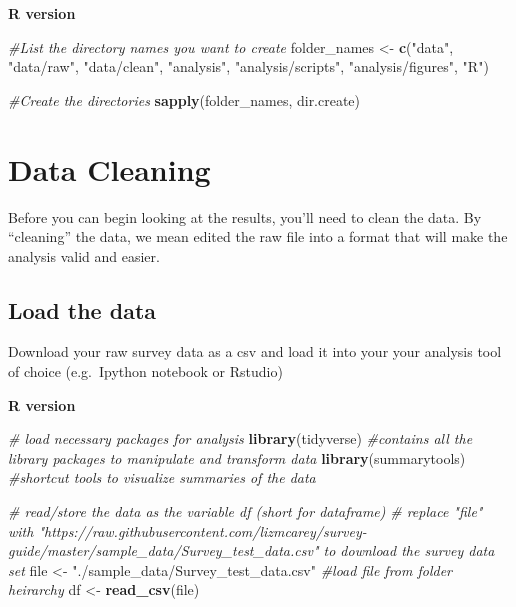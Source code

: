 \documentclass[]{book}
\newenvironment{Shaded}{\begin{snugshade}}{\end{snugshade}}
\newcommand{\CommentTok}[1]{\textcolor[rgb]{0.56,0.35,0.01}{\textit{#1}}}
\newcommand{\KeywordTok}[1]{\textcolor[rgb]{0.13,0.29,0.53}{\textbf{#1}}}
\newcommand{\NormalTok}[1]{#1}
\newcommand{\StringTok}[1]{\textcolor[rgb]{0.31,0.60,0.02}{#1}}
\begin{document}
\textbf{R version}

\begin{Shaded}
\begin{Highlighting}[]
\CommentTok{#List the directory names you want to create}
\NormalTok{folder_names <-}\StringTok{ }\KeywordTok{c}\NormalTok{(}\StringTok{"data"}\NormalTok{, }
                    \StringTok{"data/raw"}\NormalTok{, }
                    \StringTok{"data/clean"}\NormalTok{, }
                  \StringTok{"analysis"}\NormalTok{, }
                    \StringTok{"analysis/scripts"}\NormalTok{, }
                     \StringTok{"analysis/figures"}\NormalTok{, }
                  \StringTok{"R"}\NormalTok{)}

\CommentTok{#Create the directories}
\KeywordTok{sapply}\NormalTok{(folder_names, dir.create)}
\end{Highlighting}
\end{Shaded}

\hypertarget{data-cleaning}{%
\section{Data Cleaning}\label{data-cleaning}}

Before you can begin looking at the results, you'll need to clean the data. By ``cleaning'' the data, we mean edited the raw file into a format that will make the analysis valid and easier.

\hypertarget{load-the-data}{%
\subsection{Load the data}\label{load-the-data}}

Download your raw survey data as a csv and load it into your your analysis tool of choice (e.g.~Ipython notebook or Rstudio)

\textbf{R version}

\begin{Shaded}
\begin{Highlighting}[]
\CommentTok{# load necessary packages for analysis}
\KeywordTok{library}\NormalTok{(tidyverse)        }\CommentTok{#contains all the library packages to manipulate and transform data}
\KeywordTok{library}\NormalTok{(summarytools)     }\CommentTok{#shortcut tools to visualize summaries of the data}

\CommentTok{# read/store the data as the variable df (short for dataframe)}
\CommentTok{# replace "file" with "https://raw.githubusercontent.com/lizmcarey/survey-guide/master/sample_data/Survey_test_data.csv" to download the survey data set}
\NormalTok{file <-}\StringTok{ "./sample_data/Survey_test_data.csv"} \CommentTok{#load file from folder heirarchy }
\NormalTok{df <-}\StringTok{ }\KeywordTok{read_csv}\NormalTok{(file)}
\end{Highlighting}
\end{Shaded}
\end{document}
